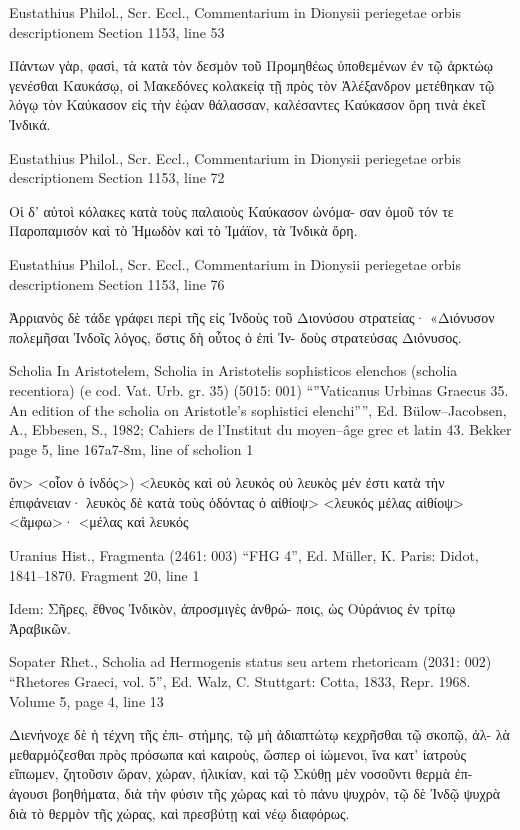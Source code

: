 \documentclass[12pt,letterpaper,twoside,final]{memoir}
\begin{document}
\begin{greek}
Eustathius Philol., Scr. Eccl., Commentarium in Dionysii periegetae orbis descriptionem 
Section 1153, line 53

                          Πάντων γὰρ, φασὶ, τὰ κατὰ 
τὸν δεσμὸν τοῦ Προμηθέως ὑποθεμένων ἐν τῷ ἀρκτώῳ 
γενέσθαι Καυκάσῳ, οἱ Μακεδόνες κολακείᾳ τῇ πρὸς 
τὸν Ἀλέξανδρον μετέθηκαν τῷ λόγῳ τὸν Καύκασον εἰς 
τὴν ἑῴαν θάλασσαν, καλέσαντες Καύκασον ὄρη τινὰ 
ἐκεῖ Ἰνδικά. 



Eustathius Philol., Scr. Eccl., Commentarium in Dionysii periegetae orbis descriptionem 
Section 1153, line 72

                                                      Οἱ δ' 
αὐτοὶ κόλακες κατὰ τοὺς παλαιοὺς Καύκασον ὠνόμα-
σαν ὁμοῦ τόν τε Παροπαμισὸν καὶ τὸ Ἠμωδὸν καὶ τὸ 
Ἰμάϊον, τὰ Ἰνδικὰ ὄρη. 



Eustathius Philol., Scr. Eccl., Commentarium in Dionysii periegetae orbis descriptionem 
Section 1153, line 76

                         Ἀρριανὸς δὲ τάδε γράφει περὶ 
τῆς εἰς Ἰνδοὺς τοῦ Διονύσου στρατείας· «Διόνυσον 
πολεμῆσαι Ἰνδοῖς λόγος, ὅστις δὴ οὗτος ὁ ἐπὶ Ἰν-
δοὺς στρατεύσας Διόνυσος. 



Scholia In Aristotelem, Scholia in Aristotelis sophisticos elenchos (scholia recentiora) (e cod. Vat. Urb. gr. 35) (5015: 001)
“”Vaticanus Urbinas Graecus 35. An edition of the scholia on Aristotle's sophistici elenchi””, Ed. Bülow–Jacobsen, A., Ebbesen, S., 1982; Cahiers de l'Institut du moyen–âge grec et latin 43.
Bekker page 5, line 167a7-8m, line of scholion 1

ὄν> 
<οἷον ὁ ἰνδός>) 
<λευκὸς καὶ 
οὐ λευκός 
οὐ λευκὸς μέν ἐστι κατὰ τὴν ἐπιφάνειαν· 
λευκὸς δὲ κατὰ τοὺς ὀδόντας 
ὁ αἰθίοψ>   
<λευκός μέλας 
αἰθίοψ> 
<ἄμφω>· 
<μέλας καὶ λευκός 




Uranius Hist., Fragmenta (2461: 003)
“FHG 4”, Ed. Müller, K.
Paris: Didot, 1841–1870.
Fragment 20, line 1

Idem: Σῆρες, ἔθνος Ἰνδικὸν, ἀπροσμιγὲς ἀνθρώ-
ποις, ὡς Οὐράνιος ἐν τρίτῳ Ἀραβικῶν. 



Sopater Rhet., Scholia ad Hermogenis status seu artem rhetoricam (2031: 002)
“Rhetores Graeci, vol. 5”, Ed. Walz, C.
Stuttgart: Cotta, 1833, Repr. 1968.
Volume 5, page 4, line 13

                          Διενήνοχε δὲ ἡ τέχνη τῆς ἐπι-
στήμης, τῷ μὴ ἀδιαπτώτῳ κεχρῆσθαι τῷ σκοπῷ, ἀλ-
λὰ μεθαρμόζεσθαι πρὸς πρόσωπα καὶ καιροὺς, ὥσπερ 
οἱ ἰώμενοι, ἵνα κατ' ἰατροὺς εἴπωμεν, ζητοῦσιν ὥραν, 
χώραν, ἡλικίαν, καὶ τῷ Σκύθῃ μὲν νοσοῦντι θερμὰ ἐπ-
άγουσι βοηθήματα, διὰ τὴν φύσιν τῆς χώρας καὶ τὸ 
πάνυ ψυχρὸν, τῷ δὲ Ἰνδῷ ψυχρὰ διὰ τὸ θερμὸν τῆς 
χώρας, καὶ πρεσβύτῃ καὶ νέῳ διαφόρως. 




\end{greek}
\end{document}

